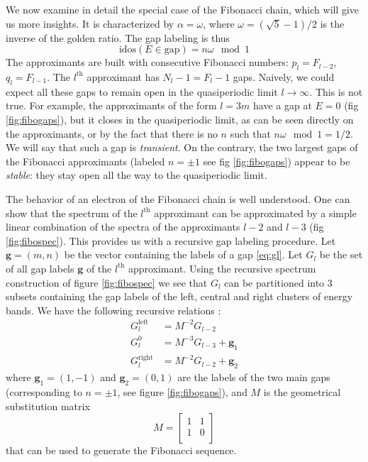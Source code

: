 \documentclass[a4paper]{jpconf}
\newcommand{\gv}{\ensuremath{\mathbf{g}}}
\newcommand{\sub}{\ensuremath{M}}
\newcommand{\id}{\ensuremath{\text{idos}}}
\begin{document}
We now examine in detail the special case of the Fibonacci chain, which will give us more insights.
It is characterized by $\alpha = \omega$, where $\omega = (\sqrt{5}-1)/2$ is the inverse of the golden ratio.
The gap labeling is thus
\begin{equation}
	\label{eq:fibogaps}
	\id(E \in \text{gap}) = n \omega \mod 1
\end{equation}
The approximants are built with consecutive Fibonacci numbers: $p_l = F_{l-2}$, $q_l = F_{l-1}$.
The $l^\text{th}$ approximant has $N_l-1 = F_l -1$ gaps.
Naively, we could expect all these gaps to remain open in the quasiperiodic limit $l \to \infty$.
This is not true. 
For example, the approximants of the form $l = 3m$ have a gap at $E=0$ (fig \eqref{fig:fibogaps}), but it closes in the quasiperiodic limit, as can be seen directly on the approximants, or by the fact that there is no $n$ such that $n \omega \mod 1 = 1/2$.
We will say that such a gap is \emph{transient}.
On the contrary, the two largest gaps of the Fibonacci approximants (labeled $n = \pm 1$ see fig \eqref{fig:fibogaps}) appear to be \emph{stable}: they stay open all the way to the quasiperiodic limit.

The behavior of an electron of the Fibonacci chain is well understood. 
One can show \cite{Niu90, Piechon95} that the spectrum of the $l^\text{th}$ approximant can be approximated by a simple linear combination of the spectra of the approximants $l-2$ and $l-3$ (fig \eqref{fig:fibospec}).
This provides us with a recursive gap labeling procedure. 
Let $\gv = (m, n)$ be the vector containing the labels of a gap \eqref{eq:gl}.
Let $G_l$ be the set of all gap labels $\gv$ of the $l^\text{th}$ approximant.
Using the recursive spectrum construction of figure \eqref{fig:fibospec} we see that $G_l$ can be partitioned into 3 subsets containing the gap labels of the left, central and right clusters of energy bands.
We have the following recursive relations \cite{fiboperturbMace}:
\begin{align}
	G_{l}^{\text{left}} &= \sub^{-2} G_{l-2} \\
	G_{l}^0 &= \sub^{-3} G_{l-3} + \gv_1\\
	G_{l}^\text{right} &= \sub^{-2} G_{l-2} + \gv_2
\end{align}
where $\gv_1 = (1, -1)$ and $\gv_2 = (0, 1)$ are the labels of the two main gaps (corresponding to $n = \pm 1$, see figure \eqref{fig:fibogaps}),
and $\sub$ is the geometrical substitution matrix
\begin{equation}
	\sub = 
	\begin{bmatrix}
		1 & 1\\
		1 & 0\\
	\end{bmatrix}
\end{equation}
that can be used to generate the Fibonacci sequence.
\end{document}
